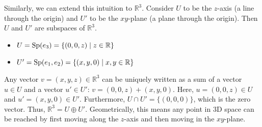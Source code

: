 \begin{center}
\end{center}

Similarly, we can extend this intuition to $\mathbb{R}^3$. Consider $U$ to be the $z$-axis (a line through the origin) and $U'$ to be the $xy$-plane (a plane through the origin). Then $U$ and $U'$ are subspaces of $\mathbb{R}^3$.
\begin{itemize}
  \item $U = \operatorname{Sp}(e_3) = \{(0,0,z) \mid z \in \mathbb{R}\}$
  \item $U' = \operatorname{Sp}(e_1, e_2) = \{(x,y,0) \mid x,y \in \mathbb{R}\}$
\end{itemize}
Any vector $v = (x,y,z) \in \mathbb{R}^3$ can be uniquely written as a sum of a vector $u \in U$ and a vector $u' \in U'$:
$v = (0,0,z) + (x,y,0)$.
Here, $u = (0,0,z) \in U$ and $u' = (x,y,0) \in U'$.
Furthermore, $U \cap U' = \{(0,0,0)\}$, which is the zero vector.
Thus, $\mathbb{R}^3 = U \oplus U'$. Geometrically, this means any point in 3D space can be reached by first moving along the $z$-axis and then moving in the $xy$-plane.

